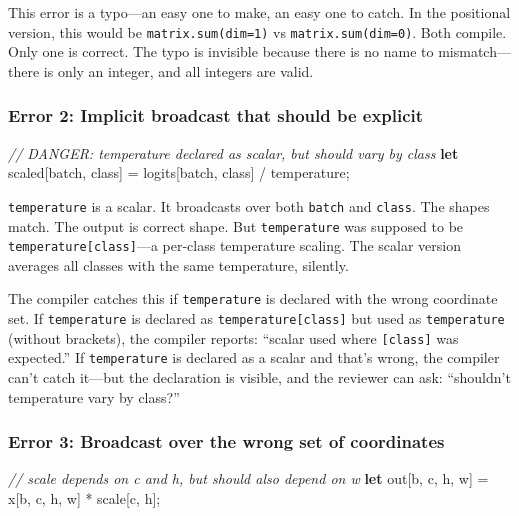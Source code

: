 \documentclass[11pt,titlepage]{article}
\newenvironment{Shaded}{}{}
\newcommand{\CommentTok}[1]{\textcolor[rgb]{0.38,0.63,0.69}{\textit{#1}}}
\newcommand{\KeywordTok}[1]{\textcolor[rgb]{0.00,0.44,0.13}{\textbf{#1}}}
\newcommand{\NormalTok}[1]{#1}
\newcommand{\OperatorTok}[1]{\textcolor[rgb]{0.40,0.40,0.40}{#1}}
\begin{document}
This error is a typo---an easy one to make, an easy one to catch. In the
positional version, this would be \texttt{matrix.sum(dim=1)} vs
\texttt{matrix.sum(dim=0)}. Both compile. Only one is correct. The typo
is invisible because there is no name to mismatch---there is only an
integer, and all integers are valid.

\hypertarget{error-2-implicit-broadcast-that-should-be-explicit}{%
\subsubsection{Error 2: Implicit broadcast that should be
explicit}\label{error-2-implicit-broadcast-that-should-be-explicit}}

\begin{Shaded}
\begin{Highlighting}[]
\CommentTok{// DANGER: temperature declared as scalar, but should vary by class}
\KeywordTok{let}\NormalTok{ scaled}\OperatorTok{[}\NormalTok{batch, class}\OperatorTok{]}\NormalTok{ = logits}\OperatorTok{[}\NormalTok{batch, class}\OperatorTok{]}\NormalTok{ / temperature;}
\end{Highlighting}
\end{Shaded}

\texttt{temperature} is a scalar. It broadcasts over both \texttt{batch}
and \texttt{class}. The shapes match. The output is correct shape. But
\texttt{temperature} was supposed to be
\texttt{temperature{[}class{]}}---a per-class temperature scaling. The
scalar version averages all classes with the same temperature, silently.

The compiler catches this if \texttt{temperature} is declared with the
wrong coordinate set. If \texttt{temperature} is declared as
\texttt{temperature{[}class{]}} but used as \texttt{temperature}
(without brackets), the compiler reports: ``scalar used where
\texttt{{[}class{]}} was expected.'' If \texttt{temperature} is declared
as a scalar and that's wrong, the compiler can't catch it---but the
declaration is visible, and the reviewer can ask: ``shouldn't
temperature vary by class?''

\hypertarget{error-3-broadcast-over-the-wrong-set-of-coordinates}{%
\subsubsection{Error 3: Broadcast over the wrong set of
coordinates}\label{error-3-broadcast-over-the-wrong-set-of-coordinates}}

\begin{Shaded}
\begin{Highlighting}[]
\CommentTok{// scale depends on c and h, but should also depend on w}
\KeywordTok{let}\NormalTok{ out}\OperatorTok{[}\NormalTok{b, c, h, w}\OperatorTok{]}\NormalTok{ = x}\OperatorTok{[}\NormalTok{b, c, h, w}\OperatorTok{]}\NormalTok{ * scale}\OperatorTok{[}\NormalTok{c, h}\OperatorTok{]}\NormalTok{;}
\end{Highlighting}
\end{Shaded}
\end{document}
